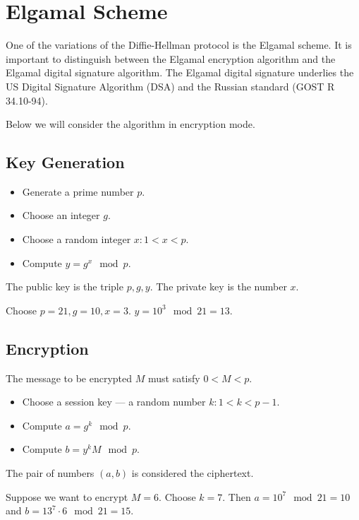 \section{Elgamal Scheme}
\label{sec:add:dm:elgamal}
One of the variations of the Diffie-Hellman protocol is the Elgamal scheme. It is important to distinguish between the Elgamal encryption algorithm and the Elgamal digital signature algorithm. The Elgamal digital signature underlies the US Digital Signature Algorithm (DSA) and the Russian standard (GOST R 34.10-94).

Below we will consider the algorithm in encryption mode.

\subsection{Key Generation}

\begin{itemize}
\item Generate a prime number $p$.
\item Choose an integer $g$.
\item Choose a random integer $x: 1 < x < p$.
\item Compute $y = g^x \mod p$.
\end{itemize}

The public key is the triple $p, g, y$. The private key is the number $x$.

\begin{example}
Choose $p = 21, g = 10, x = 3$. $y = 10^3 \mod 21 = 13$.
\label{ex:add:dm:elgamal_gen}
\end{example}

\subsection{Encryption}
The message to be encrypted $M$ must satisfy $0 < M < p$.
\begin{itemize}
\item Choose a session key — a random number $k: 1 < k < p - 1$.
\item Compute $a = g^k \mod p$.
\item Compute $b = y^k M \mod p$.
\end{itemize}

The pair of numbers $(a, b)$ is considered the ciphertext.
\begin{example}
Suppose we want to encrypt $M=6$.
Choose $k = 7$. Then $a = 10^7 \mod 21 = 10$ and $b = 13^7 \cdot 6 \mod 21 = 15$.
\label{ex:add:dm:elgamal_crypt}
\end{example}

